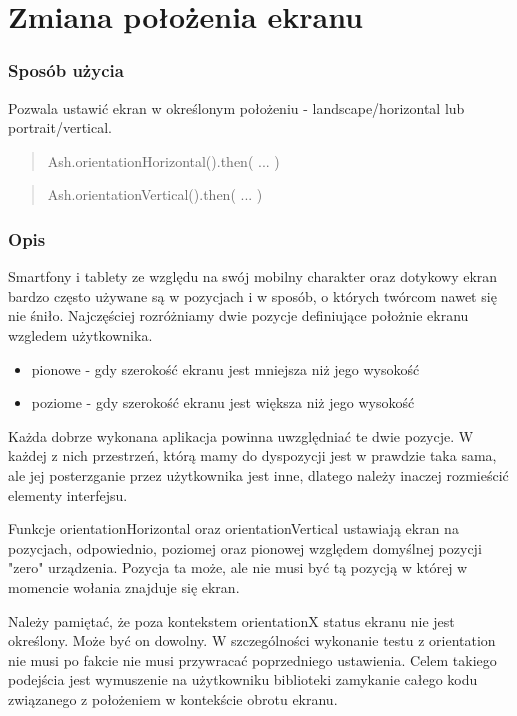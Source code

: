 \documentclass[brudnopis]{xmgr}
\begin{document}
\section{Zmiana położenia ekranu}

\subsubsection{Sposób użycia}
Pozwala ustawić ekran w określonym położeniu - landscape/horizontal lub portrait/vertical.

\begin{quote}
Ash.orientationHorizontal().then( ... ) 
\end{quote}

\begin{quote}
Ash.orientationVertical().then( ... ) 
\end{quote}

\subsubsection{Opis}

Smartfony i tablety ze względu na swój mobilny charakter oraz dotykowy ekran bardzo często używane są w pozycjach i w sposób, o których twórcom nawet się nie śniło. Najczęściej rozróżniamy dwie pozycje definiujące położnie ekranu wzgledem użytkownika. 

\begin{itemize}
  \item pionowe - gdy szerokość ekranu jest mniejsza niż jego wysokość
  \item poziome - gdy szerokość ekranu jest większa niż jego wysokość
\end{itemize}

Każda dobrze wykonana aplikacja powinna uwzględniać te dwie pozycje. W każdej z nich przestrzeń, którą mamy do dyspozycji jest w prawdzie taka sama, ale jej posterzganie przez użytkownika jest inne, dlatego należy inaczej rozmieścić elementy interfejsu.  

Funkcje orientationHorizontal oraz orientationVertical  ustawiają ekran na pozycjach, odpowiednio, poziomej oraz pionowej względem domyślnej pozycji "zero" urządzenia. Pozycja ta może, ale nie musi być tą pozycją w której w momencie wołania znajduje się ekran.  

Należy pamiętać, że poza kontekstem orientationX status ekranu nie jest określony. Może być on dowolny. W szczególności wykonanie testu z orientation nie musi po fakcie nie musi przywracać poprzedniego ustawienia. Celem takiego podejścia jest wymuszenie na użytkowniku biblioteki zamykanie całego kodu związanego z położeniem w kontekście obrotu ekranu. 
\end{document}
